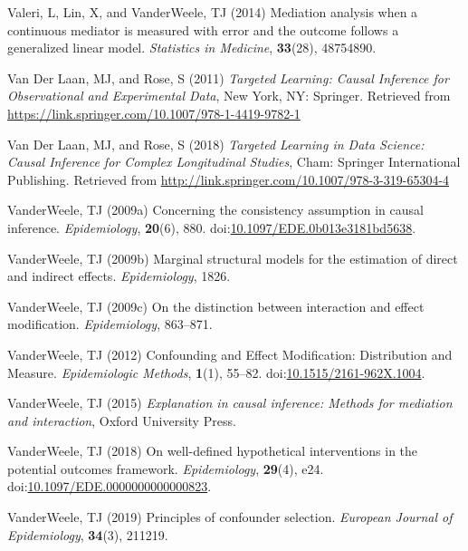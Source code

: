 \documentclass[
  singlecolumn]{article}
\newlength{\cslhangindent}
\newenvironment{CSLReferences}[2] %
 {\begin{list}{}{%
  \setlength{\itemindent}{0pt}
  \setlength{\leftmargin}{0pt}
  \setlength{\parsep}{0pt}
  \ifodd #1
   \setlength{\leftmargin}{\cslhangindent}
   \setlength{\itemindent}{-1\cslhangindent}
  \fi
  \setlength{\itemsep}{#2\baselineskip}}}
 {\end{list}}
\begin{document}
\begin{CSLReferences}{1}{0}
Valeri, L, Lin, X, and VanderWeele, TJ (2014) Mediation analysis when a
continuous mediator is measured with error and the outcome follows a
generalized linear model. \emph{Statistics in Medicine},
\textbf{33}(28), 48754890.

Van Der Laan, MJ, and Rose, S (2011) \emph{Targeted Learning: Causal
Inference for Observational and Experimental Data}, New York, NY:
Springer. Retrieved from
\url{https://link.springer.com/10.1007/978-1-4419-9782-1}

Van Der Laan, MJ, and Rose, S (2018) \emph{Targeted Learning in Data
Science: Causal Inference for Complex Longitudinal Studies}, Cham:
Springer International Publishing. Retrieved from
\url{http://link.springer.com/10.1007/978-3-319-65304-4}

VanderWeele, TJ (2009a) Concerning the consistency assumption in causal
inference. \emph{Epidemiology}, \textbf{20}(6), 880.
doi:\href{https://doi.org/10.1097/EDE.0b013e3181bd5638}{10.1097/EDE.0b013e3181bd5638}.

VanderWeele, TJ (2009b) Marginal structural models for the estimation of
direct and indirect effects. \emph{Epidemiology}, 1826.

VanderWeele, TJ (2009c) On the distinction between interaction and
effect modification. \emph{Epidemiology}, 863--871.

VanderWeele, TJ (2012) Confounding and Effect Modification: Distribution
and Measure. \emph{Epidemiologic Methods}, \textbf{1}(1), 55--82.
doi:\href{https://doi.org/10.1515/2161-962X.1004}{10.1515/2161-962X.1004}.

VanderWeele, TJ (2015) \emph{Explanation in causal inference: Methods
for mediation and interaction}, Oxford University Press.

VanderWeele, TJ (2018) On well-defined hypothetical interventions in the
potential outcomes framework. \emph{Epidemiology}, \textbf{29}(4), e24.
doi:\href{https://doi.org/10.1097/EDE.0000000000000823}{10.1097/EDE.0000000000000823}.

VanderWeele, TJ (2019) Principles of confounder selection.
\emph{European Journal of Epidemiology}, \textbf{34}(3), 211219.


\end{CSLReferences}
\end{document}
